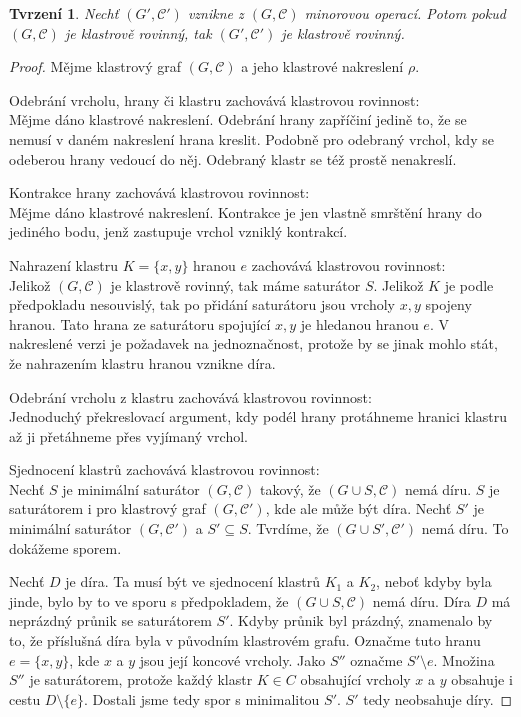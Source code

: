 \documentclass[12pt,a4report]{report}
\newtheorem{tvr}[theorem]{Tvrzení}
\theoremstyle{definition}
\begin{document}
\begin{tvr} Nechť $(G', \mathcal C')$ vznikne z $(G, \mathcal C)$ minorovou operací. Potom pokud $(G, \mathcal C)$ je klastrově rovinný, tak $(G', \mathcal C')$ je klastrově rovinný.
\label{min_op_zach_kl_rov}
\end{tvr}
\begin{proof}

Mějme klastrový graf $(G, \mathcal C)$ a jeho klastrové nakreslení $\rho$.

Odebrání vrcholu, hrany či klastru zachovává klastrovou rovinnost:\\
Mějme dáno klastrové nakreslení. Odebrání hrany zapříčiní jedině to, že se nemusí v daném nakreslení hrana kreslit. Podobně pro odebraný vrchol, kdy se odeberou hrany vedoucí do něj. Odebraný klastr se též prostě nenakreslí.

Kontrakce hrany zachovává klastrovou rovinnost:\\
Mějme dáno klastrové nakreslení. Kontrakce je jen vlastně smrštění hrany do jediného bodu, jenž zastupuje vrchol vzniklý kontrakcí.

Nahrazení klastru $K=\{x,y\}$ hranou $e$ zachovává klastrovou rovinnost:\\
Jelikož $(G, \mathcal C)$ je klastrově rovinný, tak máme saturátor $S$. Jelikož $K$ je podle předpokladu nesouvislý, tak po přidání saturátoru jsou vrcholy $x, y$ spojeny hranou. Tato hrana ze saturátoru spojující $x,y$ je hledanou hranou $e$. V nakreslené verzi je požadavek na jednoznačnost, protože by se jinak mohlo stát, že nahrazením klastru hranou vznikne díra.  

Odebrání vrcholu z klastru zachovává klastrovou rovinnost:\\
Jednoduchý překreslovací argument, kdy podél hrany protáhneme hranici klastru až ji přetáhneme přes vyjímaný vrchol.

Sjednocení klastrů zachovává klastrovou rovinnost:\\
Nechť $S$ je minimální saturátor $(G,\mathcal C)$ takový, že $(G \cup S,\mathcal C)$ nemá díru. $S$ je saturátorem i pro klastrový graf $(G, \mathcal C')$, kde ale může být díra.
Nechť $S'$ je minimální saturátor $(G, \mathcal C')$ a $S' \subseteq S$. Tvrdíme, že $(G \cup S',\mathcal C')$ nemá díru. To dokážeme sporem.

Nechť $D$ je díra. Ta musí být ve sjednocení klastrů $K_1$ a $K_2$, neboť kdyby byla jinde, bylo by to ve sporu s předpokladem, že $(G \cup S, \mathcal C)$ nemá díru.
Díra $D$ má neprázdný průnik se saturátorem $S'$. Kdyby průnik byl prázdný, znamenalo by to, že příslušná díra byla v původním klastrovém grafu. Označme tuto hranu $e = \{x,y\}$, kde $x$ a $y$ jsou její koncové vrcholy.
Jako $S''$ označme $S' \setminus e$. Množina $S''$ je saturátorem, protože každý klastr $K \in C$ obsahující vrcholy  $x$ a $y$ obsahuje i cestu $D \setminus \{e\}$. Dostali jsme tedy spor s minimalitou $S'$. $S'$ tedy neobsahuje díry.
\end{proof}
\end{document}
